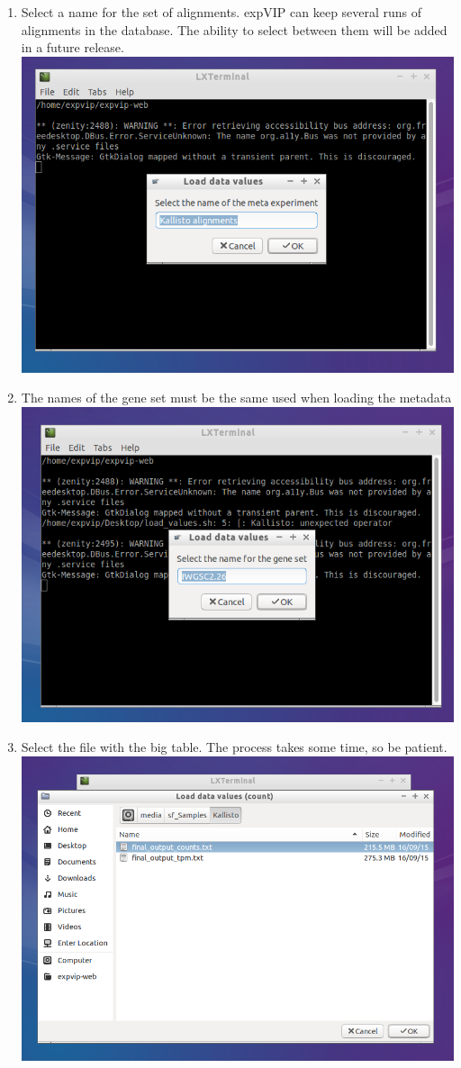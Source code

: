 \begin{enumerate}
\item
  Select a name for the set of alignments. expVIP can keep several runs
  of alignments in the database. The ability to select between them will
  be added in a future release.
  \includegraphics{images/LoadValues03.png}
\item
  The names of the gene set must be the same used when loading the
  metadata \includegraphics{images/LoadValues04.png}
\item
  Select the file with the big table. The process takes some time, so be
  patient. \includegraphics{images/LoadValues05.png}

\end{enumerate}
